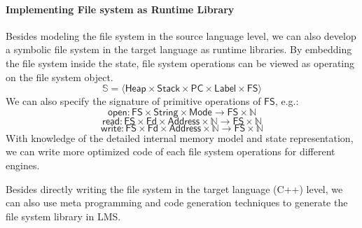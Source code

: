 \documentclass[sigplan, nonacm]{acmart}\settopmatter{printfolios=true,printccs=false,printacmref=false}
\newcommand{\msf}[1]{\ensuremath{\mathsf{#1}}}
\newcommand{\State}{\mathbb{S}}
\begin{document}
 \paragraph*{Implementing File system as Runtime Library}
Besides modeling the file system in the source language level, we can also develop a symbolic file system in the target language as runtime libraries. By embedding the file system inside the state, file system operations can be viewed as operating on the file system object.
$$ \State = \langle \msf{Heap} \times \msf{Stack} \times \msf{PC} \times \msf{Label} \times \msf{FS} \rangle $$
We can also specify the signature of primitive operations of \msf{FS}, e.g.:
$$ \msf{open} : \msf{FS} \times \msf{String} \times \msf{Mode} \to \msf{FS} \times \mathbb{N}$$
$$ \msf{read} : \msf{FS} \times \msf{Fd} \times \msf{Address} \times \mathbb{N} \to \msf{FS} \times \mathbb{N}$$
$$ \msf{write} : \msf{FS} \times \msf{Fd} \times \msf{Address} \times \mathbb{N} \to \msf{FS} \times \mathbb{N}$$
With knowledge of the detailed internal memory model and state representation, we can write more optimized code of each file system operations for different engines.\par
Besides directly writing the file system in the target language (C++) level, we can also use meta programming and code generation techniques to generate the file system library in LMS.
\end{document}

